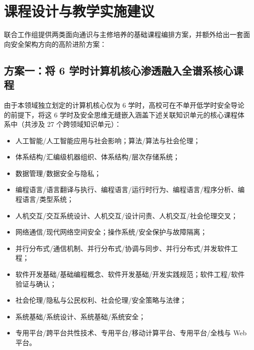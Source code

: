 \section{课程设计与教学实施建议}

联合工作组提供两类面向通识与主修培养的基础课程编排方案，并额外给出一套面向安全架构方向的高阶进阶方案：

\subsection{方案一：将 6 学时计算机核心渗透融入全谱系核心课程}
由于本领域独立划定的计算机核心仅为 6 学时，高校可在不单开低学时安全导论的前提下，将这 6 学时及安全思维无缝嵌入涵盖下述关联知识单元的核心课程体系中（共涉及 27 个跨领域知识单元）：
\begin{itemize}\setlength{\itemsep}{0pt}\setlength{\parskip}{0pt}
    \item 人工智能/人工智能应用与社会影响；算法/算法与社会伦理；
    \item 体系结构/汇编级机器组织、体系结构/层次存储系统；
    \item 数据管理/数据安全与隐私；
    \item 编程语言/语言翻译与执行、编程语言/运行时行为、编程语言/程序分析、编程语言/类型系统；
    \item 人机交互/交互系统设计、人机交互/设计问责、人机交互/社会伦理交叉；
    \item 网络通信/现代网络空间安全；操作系统/安全保护与故障隔离；
    \item 并行分布式/通信机制、并行分布式/协调与同步、并行分布式/并发软件工程；
    \item 软件开发基础/基础编程概念、软件开发基础/开发实践规范；软件工程/软件验证与确认；
    \item 社会伦理/隐私与公民权利、社会伦理/安全策略与法律；
    \item 系统基础/系统设计、系统基础/系统安全；
    \item 专用平台/跨平台共性技术、专用平台/移动计算平台、专用平台/全栈与 Web 平台。
\end{itemize}

